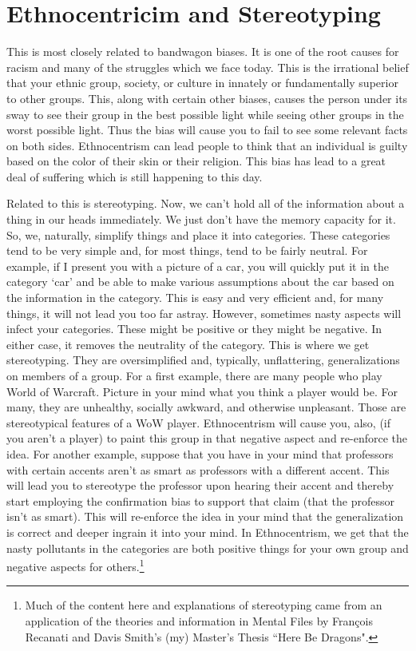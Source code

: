 \section{Ethnocentricim and Stereotyping}
This is most closely related to bandwagon biases. It is one of the root causes for racism and many of the struggles which we face today. This is the irrational belief that your ethnic group, society, or culture in innately or fundamentally superior to other groups. This, along with certain other biases, causes the person under its sway to see their group in the best possible light while seeing other groups in the worst possible light. Thus the bias will cause you to fail to see some relevant facts on both sides. Ethnocentrism can lead people to think that an individual is guilty based on the color of their skin or their religion. This bias has lead to a great deal of suffering which is still happening to this day.

Related to this is stereotyping. Now, we can't hold all of the information about a thing in our heads immediately. We just don't have the memory capacity for it. So, we, naturally, simplify things and place it into categories. These categories tend to be very simple and, for most things, tend to be fairly neutral. For example, if I present you with a picture of a car, you will quickly put it in the category `car' and be able to make various assumptions about the car based on the information in the category. This is easy and very efficient and, for many things, it will not lead you too far astray. However, sometimes nasty aspects will infect your categories. These might be positive or they might be negative. In either case, it removes the neutrality of the category. This is where we get stereotyping. They are oversimplified and, typically, unflattering, generalizations on members of a group. For a first example, there are many people who play World of Warcraft. Picture in your mind what you think a player would be. For many, they are unhealthy, socially awkward, and otherwise unpleasant. Those are stereotypical features of a WoW player. Ethnocentrism will cause you, also, (if you aren't a player) to paint this group in that negative aspect and re-enforce the idea. For another example, suppose that you have in your mind that professors with certain accents aren't as smart as professors with a different accent. This will lead you to stereotype the professor upon hearing their accent and thereby start employing the confirmation bias to support that claim (that the professor isn't as smart). This will re-enforce the idea in your mind that the generalization is correct and deeper ingrain it into your mind. In Ethnocentrism, we get that the nasty pollutants in the categories are both positive things for your own group and negative aspects for others.\footnote{Much of the content here and explanations of stereotyping came from an application of the theories and information in Mental Files by François Recanati and Davis Smith's (my) Master's Thesis ``Here Be Dragons".}

